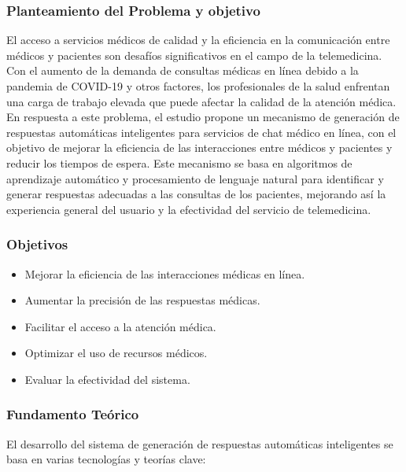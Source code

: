 	\subsubsection{Planteamiento del Problema y objetivo}
	El acceso a servicios médicos de calidad y la eficiencia en la comunicación entre médicos y pacientes son desafíos significativos en el campo de la telemedicina. Con el aumento de la demanda de consultas médicas en línea debido a la pandemia de COVID-19 y otros factores, los profesionales de la salud enfrentan una carga de trabajo elevada que puede afectar la calidad de la atención médica. En respuesta a este problema, el estudio propone un mecanismo de generación de respuestas automáticas inteligentes para servicios de chat médico en línea, con el objetivo de mejorar la eficiencia de las interacciones entre médicos y pacientes y reducir los tiempos de espera. Este mecanismo se basa en algoritmos de aprendizaje automático y procesamiento de lenguaje natural para identificar y generar respuestas adecuadas a las consultas de los pacientes, mejorando así la experiencia general del usuario y la efectividad del servicio de telemedicina.
	
	\subsubsection{Objetivos}
		\begin{itemize}
			\item Mejorar la eficiencia de las interacciones médicas en línea.
			\item Aumentar la precisión de las respuestas médicas.
			\item Facilitar el acceso a la atención médica.
			\item Optimizar el uso de recursos médicos.
			\item Evaluar la efectividad del sistema.
		\end{itemize}	


	\subsubsection{Fundamento Teórico}
	El desarrollo del sistema de generación de respuestas automáticas inteligentes se basa en varias tecnologías y teorías clave:
		
